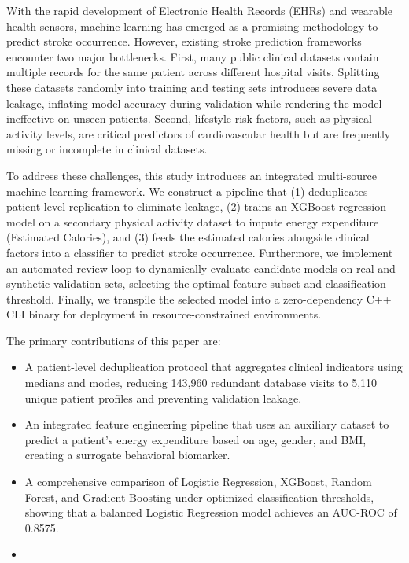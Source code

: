 \documentclass[11pt,letterpaper]{article}
\begin{document}
With the rapid development of Electronic Health Records (EHRs) and wearable health sensors, machine learning has emerged as a promising methodology to predict stroke occurrence. However, existing stroke prediction frameworks encounter two major bottlenecks. First, many public clinical datasets contain multiple records for the same patient across different hospital visits. Splitting these datasets randomly into training and testing sets introduces severe data leakage, inflating model accuracy during validation while rendering the model ineffective on unseen patients. Second, lifestyle risk factors, such as physical activity levels, are critical predictors of cardiovascular health but are frequently missing or incomplete in clinical datasets.

To address these challenges, this study introduces an integrated multi-source machine learning framework. We construct a pipeline that (1) deduplicates patient-level replication to eliminate leakage, (2) trains an XGBoost regression model on a secondary physical activity dataset to impute energy expenditure (Estimated Calories), and (3) feeds the estimated calories alongside clinical factors into a classifier to predict stroke occurrence. Furthermore, we implement an automated review loop to dynamically evaluate candidate models on real and synthetic validation sets, selecting the optimal feature subset and classification threshold. Finally, we transpile the selected model into a zero-dependency C++ CLI binary for deployment in resource-constrained environments.

The primary contributions of this paper are:
\begin{itemize}
    \item A patient-level deduplication protocol that aggregates clinical indicators using medians and modes, reducing 143,960 redundant database visits to 5,110 unique patient profiles and preventing validation leakage.
    \item An integrated feature engineering pipeline that uses an auxiliary dataset to predict a patient's energy expenditure based on age, gender, and BMI, creating a surrogate behavioral biomarker.
    \item A comprehensive comparison of Logistic Regression, XGBoost, Random Forest, and Gradient Boosting under optimized classification thresholds, showing that a balanced Logistic Regression model achieves an AUC-ROC of 0.8575.
    \item {}
\end{itemize}
\end{document}
